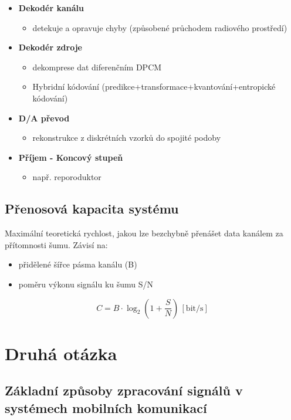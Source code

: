 \begin{itemize}
	\item \textbf{Dekodér kanálu}
	\begin{itemize}
		\item detekuje a opravuje chyby (způsobené průchodem radiového prostředí)
	\end{itemize}
	\item \textbf{Dekodér zdroje}
	\begin{itemize}
		\item dekomprese dat diferenčním DPCM
		\item Hybridní kódování (predikce+transformace+kvantování+entropické kódování)
	\end{itemize}
	\item \textbf{D/A převod}
	\begin{itemize}
		\item rekonstrukce z diskrétních vzorků do spojité podoby
	\end{itemize}
	\item \textbf{Příjem - Koncový stupeň}
	\begin{itemize}
		\item např. reporoduktor
	\end{itemize}
\end{itemize}
\section{Přenosová kapacita systému}
Maximální teoretická rychlost, jakou lze bezchybně přenášet data kanálem za přítomnosti šumu.
Závisí na:
\begin{itemize}
	\item přidělené šířce pásma kanálu (B)
	\item poměru výkonu signálu ku šumu S/N
\end{itemize}
\begin{equation}
	C = B \cdot \log_2\left(1 + \frac{S}{N}\right)\,[\mathrm{bit/s}]
\end{equation}

\chapter{Druhá otázka}
\section{Základní způsoby zpracování signálů v systémech mobilních komunikací}
